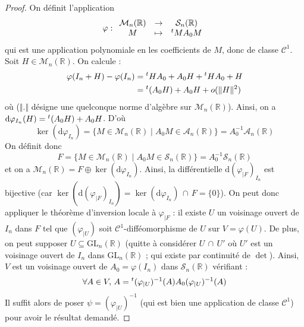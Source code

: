   \begin{proof}
    On définit l'application
    \[ \varphi :
    \begin{array}{ccc}
      \mathcal{M}_n(\mathbb{R}) &\rightarrow& \mathcal{S}_n(\mathbb{R}) \\
      M &\mapsto& \mathstrut ^t M A_0 M
    \end{array}
    \]
    qui est une application polynomiale en les coefficients de $M$, donc de classe $\mathcal{C}^1$. Soit $H \in \mathcal{M}_n(\mathbb{R})$. On calcule :
    \begin{align*}
      \varphi(I_n + H) - \varphi(I_n) &= \mathstrut ^t H A_0 + A_0 H + \mathstrut ^t H A_0 + H \\
      &= \mathstrut ^t (A_0 H) + A_0 H + o(\Vert H \Vert^2)
    \end{align*}
    où ($\Vert . \Vert$ désigne une quelconque norme d'algèbre sur $\mathcal{M}_n(\mathbb{R})$). Ainsi, on a $\mathrm{d} \varphi_{I_n}(H) = \mathstrut ^t (A_0 H) + A_0 H$. D'où
    \[ \ker(\mathrm{d} \varphi_{I_n}) = \{ M \in \mathcal{M}_n(\mathbb{R}) \mid A_0 M \in \mathcal{A}_n(\mathbb{R}) \} = A_0^{-1} \mathcal{A}_n(\mathbb{R}) \]
    On définit donc
    \[ F = \{ M \in \mathcal{M}_n(\mathbb{R}) \mid A_0 M \in \mathcal{S}_n(\mathbb{R}) \} = A_0^{-1} \mathcal{S}_n(\mathbb{R})  \]
    et on a $\mathcal{M}_n(\mathbb{R}) = F \oplus \ker(\mathrm{d} \varphi_{I_n})$. Ainsi, la différentielle $\mathrm{d} (\varphi_{|F})_{I_n}$ est bijective (car $\ker(\mathrm{d} (\varphi_{|F})_{I_n}) = \ker(\mathrm{d} \varphi_{I_n}) \, \cap \, F = \{ 0 \}$).
    \newpar
    On peut donc appliquer le théorème d'inversion locale à $\varphi_{|F}$ : il existe $U$ un voisinage ouvert de $I_n$ dans $F$ tel que $(\varphi_{|U})$ soit $\mathcal{C}^1$-difféomorphisme de $U$ sur $V = \varphi(U)$. De plus, on peut supposer $U \subseteq \mathrm{GL}_n(\mathbb{R})$ (quitte à considérer $U \, \cap \, U'$ où $U'$ est un voisinage ouvert de $I_n$ dans $\mathrm{GL}_n(\mathbb{R})$ ; qui existe par continuité de $\det$).
    \newpar
    Ainsi, $V$ est un voisinage ouvert de $A_0 = \varphi(I_n)$ dans $\mathcal{S}_n(\mathbb{R})$ vérifiant :
    \[ \forall A \in V, \, A = \mathstrut ^t (\varphi_{|U})^{-1}(A) A_0 (\varphi_{|U})^{-1}(A) \]
    Il suffit alors de poser $\psi = (\varphi_{|U})^{-1}$ (qui est bien une application de classe $\mathcal{C}^1$) pour avoir le résultat demandé.
  \end{proof}


